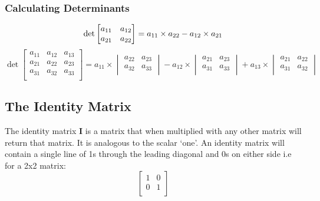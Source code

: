 \documentclass[12pt] {article}
\begin{document}
\subsubsection*{Calculating Determinants}
\begin{equation*}
  \det
  \begin{bmatrix}
    a_{11} & a_{12} \\
    a_{21} & a_{22} \\
  \end{bmatrix}
  = a_{11} \times a_{22} - a_{12} \times a_{21} \\
\end{equation*}
\begin{equation*}
  \det
  \begin{bmatrix}
    a_{11} & a_{12} & a_{13} \\
    a_{21} & a_{22} & a_{23} \\
    a_{31} & a_{32} & a_{33} \\
  \end{bmatrix}
  = a_{11} \times 
  \begin{vmatrix}
    a_{22} & a_{23} \\
    a_{32} & a_{33} \\
  \end{vmatrix}
    - a_{12} \times 
  \begin{vmatrix}
    a_{21} & a_{23} \\
    a_{31} & a_{33} \\
  \end{vmatrix}
    + a_{13} \times
  \begin{vmatrix}
    a_{21} & a_{22} \\
    a_{31} & a_{32} \\
  \end{vmatrix}
\end{equation*}

\subsection*{The Identity Matrix}
The identity matrix \textbf{I} is a matrix that when multiplied with any other matrix will
return that matrix. It is analogous to the scalar `one'. An identity matrix will contain 
a single line of 1s through the leading diagonal and 0s on either side i.e for a 2x2 matrix:
\begin{equation*}
  \begin{bmatrix}
    1 & 0 \\
    0 & 1 \\
  \end{bmatrix}
\end{equation*}
\end{document}
